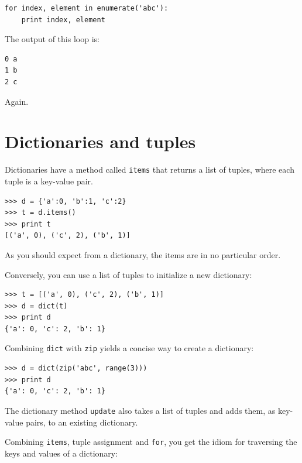 \documentclass[10pt]{book}
\begin{document}
\beforeverb
\begin{verbatim}
for index, element in enumerate('abc'):
    print index, element
\end{verbatim}
\afterverb
%
The output of this loop is:

\beforeverb
\begin{verbatim}
0 a
1 b
2 c
\end{verbatim}
\afterverb
%
Again.


\section{Dictionaries and tuples}


Dictionaries have a method called {\tt items} that returns
a list of tuples, where each tuple is a key-value pair.

\beforeverb
\begin{verbatim}
>>> d = {'a':0, 'b':1, 'c':2}
>>> t = d.items()
>>> print t
[('a', 0), ('c', 2), ('b', 1)]
\end{verbatim}
\afterverb
%
As you should expect from a dictionary, the items are in no
particular order.


Conversely, you can use a list of tuples to initialize
a new dictionary:

\beforeverb
\begin{verbatim}
>>> t = [('a', 0), ('c', 2), ('b', 1)]
>>> d = dict(t)
>>> print d
{'a': 0, 'c': 2, 'b': 1}
\end{verbatim}
\afterverb

Combining {\tt dict} with {\tt zip} yields a concise way
to create a dictionary:


\beforeverb
\begin{verbatim}
>>> d = dict(zip('abc', range(3)))
>>> print d
{'a': 0, 'c': 2, 'b': 1}
\end{verbatim}
\afterverb
%
The dictionary method {\tt update} also takes a list of tuples
and adds them, as key-value pairs, to an existing dictionary.



Combining {\tt items}, tuple assignment and {\tt for}, you
get the idiom for traversing the keys and values of a dictionary:
\end{document}
